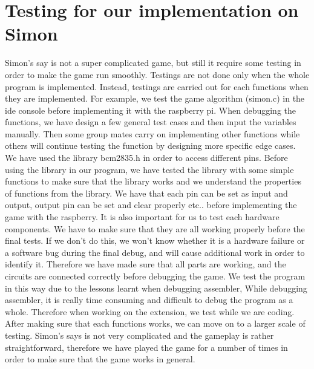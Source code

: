 \documentclass[11pt]{article}
\begin{document}
\section{Testing for our implementation on Simon}

Simon’s say is not a super complicated game, but still it require some testing in order to make the game run smoothly.\newline\newline
Testings are not done only when the whole program is implemented. Instead, testings are carried out for each functions when they are implemented. For example, we test the game algorithm (simon.c) in the ide console before implementing it with the raspberry pi.\newline \newline
When debugging the functions, we have design a few general test cases and then input the variables manually. Then some group mates carry on implementing other functions while others will continue testing the function by designing more specific edge cases.\newline \newline
We have used the library bcm2835.h in order to access different pins. Before using the library in our program, we have tested the library with some simple functions to make sure that the library works and we understand the properties of functions from the library. We have that each pin can be set as input and output, output pin can be set and clear properly etc.. before implementing the game with the raspberry.\newline \newline
It is also important for us to test each hardware components. We have to make sure that they are all working properly before the final tests. If we don't do this, we won't know whether it is a hardware failure or a software bug during the final debug, and will cause additional work in order to identify it. Therefore we have made sure that all parts are working, and the circuits are connected correctly before debugging the game.\newline \newline
We test the program in this way due to the lessons learnt when debugging assembler, While debugging assembler, it is really time consuming and difficult to debug the program as a whole. Therefore when working on the extension, we test while we are coding.\newline \newline
After making sure that each functions works, we can move on to a larger scale of testing. Simon’s says is not very complicated and the gameplay is rather straightforward, therefore we have played the game for a number of times in order to make sure that the game works in general.\newline 
\end{document}
